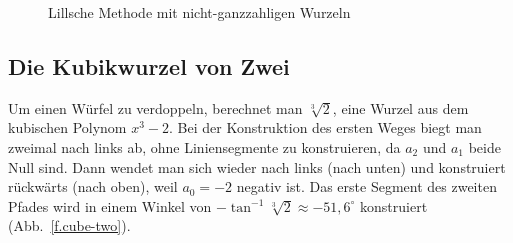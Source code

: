\begin{figure}[t]
\begin{center}
\end{center}
\caption{Lillsche Methode mit nicht-ganzzahligen Wurzeln}\label{f.noninteger}
\end{figure}

\subsection{Die Kubikwurzel von Zwei}\label{s.cube}
Um einen Würfel zu verdoppeln, berechnet man $\sqrt[3]{2}$, eine Wurzel aus dem kubischen Polynom $x^3-2$. Bei der Konstruktion des ersten Weges biegt man zweimal nach links ab, ohne Liniensegmente zu konstruieren, da $a_2$ und $a_1$ beide Null sind. Dann wendet man sich wieder nach links (nach unten) und konstruiert rückwärts (nach oben), weil $a_0=-2$ negativ ist. Das erste Segment des zweiten Pfades wird in einem Winkel von $-\tan^{-1} \sqrt[3]{2}\approx -51,6^\circ$ konstruiert (Abb.~\ref{f.cube-two}).

